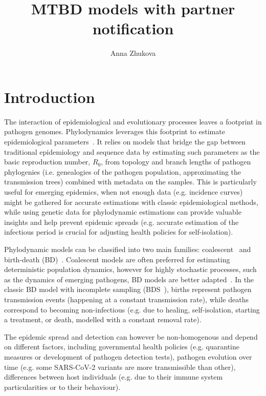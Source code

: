 \documentclass[a4paper,10pt]{article}
\title{MTBD models with partner notification}
\author{Anna Zhukova}
\begin{document}
\maketitle

%

\section{Introduction}
The interaction of epidemiological and evolutionary processes leaves a footprint in pathogen genomes. Phylodynamics leverages this footprint to estimate epidemiological parameters~\cite{Grenfell2004a,Volz2013}. It relies on models that bridge the gap between traditional epidemiology and sequence data by estimating such parameters as the basic reproduction number, $R_0$, from topology and branch lengths of pathogen phylogenies (i.e. genealogies of the pathogen population, approximating the transmission trees) combined with metadata on the samples. This is particularly useful for emerging epidemics, when not enough data (e.g. incidence curves) might be gathered for accurate estimations with classic epidemiological methods, while using genetic data for phylodynamic estimations can provide valuable insights and help prevent epidemic spreads (e.g. accurate estimation of the infectious period is crucial for adjusting health policies for self-isolation).


Phylodynamic models can be classified into two main families:  coalescent~\cite{Volz2009a,Drummond2005,Pybus2000a} and birth-death (BD)~\cite{Kendall1948,Maddison2007,Stadler2009,Stadler2010}. Coalescent models are often preferred for estimating deterministic population dynamics, however for highly stochastic processes, such as the dynamics of emerging pathogens, BD models are better adapted~\cite{Macpherson2021}. In the classic BD model with incomplete sampling (BDS~\cite{Stadler2009}), births represent pathogen transmission events (happening at a constant transmission rate), while deaths correspond to becoming non-infectious (e.g. due to healing, self-isolation, starting a treatment, or death, modelled with a constant removal rate). 

The epidemic spread and detection can however be non-homogenous and depend on different factors, including governmental health policies (e.g. quarantine measures or development of pathogen detection tests), pathogen evolution over time (e.g. some SARS-CoV-2 variants are more transmissible than other),  differences between host individuals (e.g. due to their immune system particularities or to their behaviour).
\end{document}

